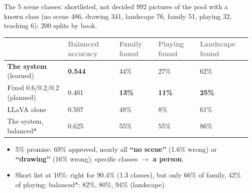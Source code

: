 \documentclass[aspectratio=169,11pt]{beamer}
\newcommand{\no}[1]{\textcolor{warn}{\textbf{#1}}}
\newcommand{\h}[1]{\textcolor{grey}{#1}}
\newcommand{\remark}[1]{\par\vspace{0.35cm}{\small\textcolor{grey}{#1}}}
\begin{document}
\begin{frame}{The 5 scene classes: shortlisted, not decided}
\footnotesize 992 pictures of the pool with a known class (no scene 486, drawing 341, landscape 76, family 51, playing 32, teaching 6); 200 splits by book.

\vspace{0.1cm}
\begin{tabular}{@{}L{4.4cm} C{1.7cm} C{1.3cm} C{1.3cm} C{1.6cm}@{}}
\toprule
 & \h{Balanced accuracy} & \h{Family found} & \h{Playing found} & \h{Landscape found}\\
\midrule
\textbf{The system} (learned) & \textbf{0.544} & 44\% & 27\% & 62\%\\
Fixed 0.6/0.2/0.2 (planned) & 0.401 & \no{13\%} & \no{11\%} & \no{25\%}\\
LLaVA alone & 0.507 & 48\% & 8\% & 61\%\\
The system, balanced* & 0.625 & 55\% & 55\% & 86\%\\
\bottomrule
\end{tabular}

\vspace{0.15cm}
\begin{itemize}\setlength\itemsep{2pt}
  \item 5\% promise: 69\% approved, nearly all \textbf{``no scene''} (1.6\% wrong) or \textbf{``drawing''} (16\% wrong); specific classes $\to$ \textbf{a person}.
  \item Short list at 10\%: right for 90.4\% (1.3 classes), but only 66\% of family, 42\% of playing; balanced*: 82\%, 80\%, 94\% (landscape).
\end{itemize}
\remark{* Added after the planned run; LLaVA alone fitted that way: 0.631. People agree on these classes only moderately ($\kappa$ = 0.34).}
\end{frame}
\end{document}
